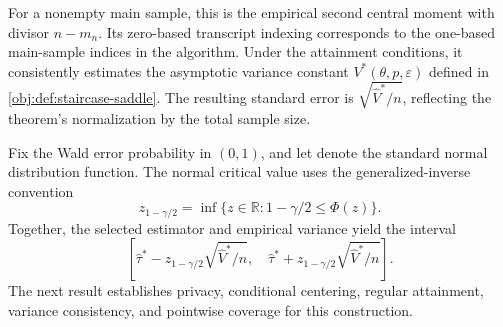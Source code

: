 For a nonempty main sample, this is the empirical second central moment with divisor \(n-m_n\). Its zero-based transcript indexing corresponds to the one-based main-sample indices in the algorithm. Under the attainment conditions, it consistently estimates the asymptotic variance constant \(V^*(\theta,p,\varepsilon)\) defined in \cref{obj:def:staircase-saddle}. The resulting standard error is \(\sqrt{\widehat V^*/n}\), reflecting the theorem's normalization by the total sample size.

Fix the Wald error probability  in \((0,1)\), and let  denote the standard normal distribution function. The normal critical value  uses the generalized-inverse convention
\[
z_{1-\gamma/2}
=\inf\{z\in\mathbb R:1-\gamma/2\le\Phi(z)\}.
\]
Together, the selected estimator and empirical variance yield the interval
\[
\left[
\widehat\tau^*-z_{1-\gamma/2}\sqrt{\widehat V^*/n},
\quad
\widehat\tau^*+z_{1-\gamma/2}\sqrt{\widehat V^*/n}
\right].
\]
The next result establishes privacy, conditional centering, regular attainment, variance consistency, and pointwise coverage for this construction.

